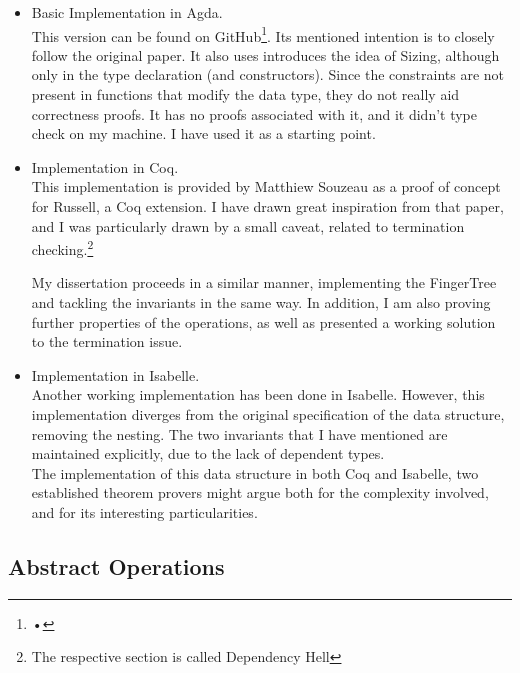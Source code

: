\documentclass[12pt,twoside,notitlepage]{report}
\begin{document}
\begin{itemize}
\item Basic Implementation in Agda. \\
This version can be found on GitHub\footnote{•}. Its mentioned intention is to closely follow the original paper. It also uses introduces the idea of Sizing, although only in the type declaration (and constructors). Since the constraints are not present in functions that modify the data type, they do not really aid correctness proofs. It has no proofs associated with it, and it didn't type check on my machine. I have used it as a starting point.
\item Implementation in Coq. \\
This implementation is provided by Matthiew Souzeau\cite{coq} as a proof of concept for Russell, a Coq extension. I have drawn great inspiration from that paper, and I was particularly drawn by a small caveat, related to termination checking.\footnote{The respective section is called Dependency Hell} 

My dissertation proceeds in a similar manner, implementing the FingerTree and tackling the invariants in the same way. In addition, I am also proving further properties of the operations, as well as presented a working solution to the termination issue.

\item Implementation in Isabelle. \\
Another working implementation has been done in Isabelle. However, this implementation diverges from the original specification of the data structure, removing the nesting. The two invariants that I have mentioned are maintained explicitly, due to the lack of dependent types.\\ 

The implementation of this data structure in both Coq and Isabelle, two established theorem provers might argue both for the complexity involved, and for its interesting particularities.
\end{itemize}

\subsection{Abstract Operations}
\end{document}
